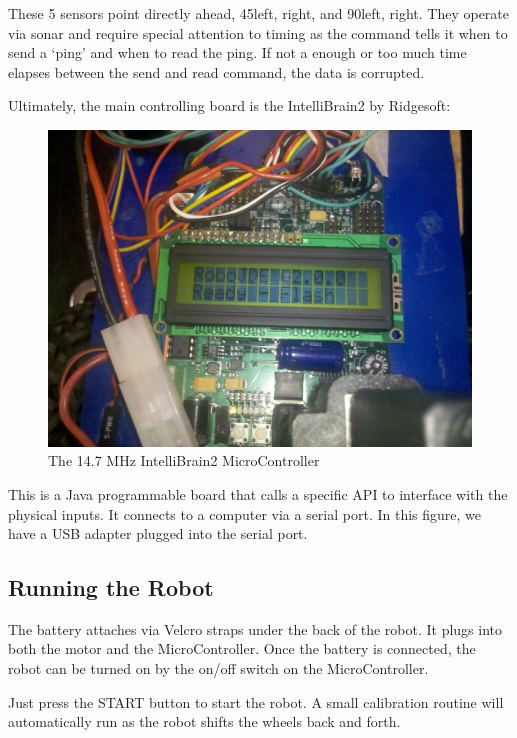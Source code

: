 \documentclass[12pt]{article}
\begin{document}
These 5 sensors point directly ahead, 45\textdegree \hspace{1mm}left, right, and 90\textdegree \hspace{1mm}left, right.  They operate via sonar and require special attention to timing as the command tells it when to send a `ping' and when to read the ping.  If not a enough or too much time elapses between the send and read command, the data is corrupted.

Ultimately, the main controlling board is the IntelliBrain2 by Ridgesoft: 
\begin{figure}[h]
\centerline{\includegraphics{img/intellibrain}}
\caption{The 14.7 MHz IntelliBrain2 MicroController}
\end{figure}

This is a Java programmable board that calls a specific API to interface with the physical inputs.  It connects to a computer via a serial port.  In this figure, we have a USB adapter plugged into the serial port. 

\subsection{Running the Robot}
The battery attaches via Velcro straps under the back of the robot.  It plugs into both the motor and the MicroController.  Once the battery is connected, the robot can be turned on by the on/off switch on the MicroController.
\vspace{2mm}

Just press the START button to start the robot.  A small calibration routine will automatically run as the robot shifts the wheels back and forth.
\end{document}
